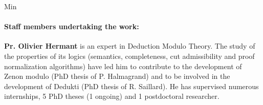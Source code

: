 \begin{sitedescription}{Min}
\paragraph{Staff members undertaking the work:}

\textbf{Pr. Olivier Hermant} is an expert in Deduction Modulo
Theory. The study of the properties of its logics (semantics,
completeness, cut admissibility and proof normalization algorithms)
have led him to contribute to the development of Zenon modulo (PhD
thesis of P. Halmagrand) and to be involved in the development of
Dedukti (PhD thesis of R. Saillard). He has supervised numerous internships, 5 PhD
theses (1 ongoing) and 1 postdoctoral researcher.
 


\end{sitedescription}

